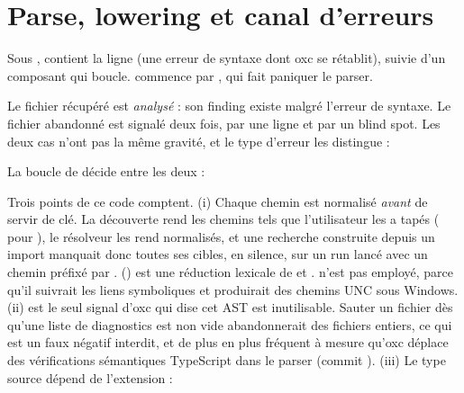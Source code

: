 \section{Parse, lowering et canal d'erreurs}
\label{sec:projet-cli-driver-parse}

Sous ,  contient la ligne  (une erreur de syntaxe dont oxc se rétablit), suivie d'un composant qui boucle.  commence par , qui fait paniquer le parser.


Le fichier récupéré est \emph{analysé} : son finding existe malgré l'erreur de syntaxe. Le fichier abandonné est signalé deux fois, par une ligne \code{[skipped]} et par un blind spot. Les deux cas n'ont pas la même gravité, et le type d'erreur les distingue :


La boucle de  décide entre les deux :


Trois points de ce code comptent. (i) Chaque chemin est normalisé \emph{avant} de servir de clé. La découverte rend les chemins tels que l'utilisateur les a tapés ( pour ), le résolveur les rend normalisés, et une recherche  construite depuis un import manquait donc toutes ses cibles, en silence, sur un run lancé avec un chemin préfixé par .  () est une réduction lexicale de  et .  n'est pas employé, parce qu'il suivrait les liens symboliques et produirait des chemins UNC sous Windows. (ii)  est le seul signal d'oxc qui dise \og cet AST est inutilisable\fg{}. Sauter un fichier dès qu'une liste de diagnostics est non vide abandonnerait des fichiers entiers, ce qui est un faux négatif interdit, et de plus en plus fréquent à mesure qu'oxc déplace des vérifications sémantiques TypeScript dans le parser (commit ). (iii) Le type source dépend de l'extension :

